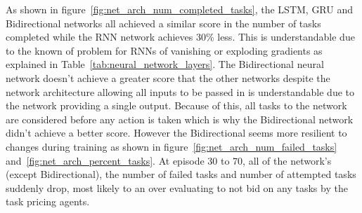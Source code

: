 As shown in figure~\ref{fig:net_arch_num_completed_tasks}, the LSTM, GRU and Bidirectional networks all achieved a
similar score in the number of tasks completed while the RNN network achieves 30\% less. This is understandable due to
the known of problem for RNNs of vanishing or exploding gradients as explained in Table~\ref{tab:neural_network_layers}.
The Bidirectional neural network doesn't achieve a greater score that the other networks despite the network
architecture allowing all inputs to be passed in is understandable due to the network providing a single output.
Because of this, all tasks to the network are considered before any action is taken which is why the Bidirectional
network didn't achieve a better score. However the Bidirectional seems more resilient to changes during training as
shown in figure~\ref{fig:net_arch_num_failed_tasks} and~\ref{fig:net_arch_percent_tasks}. At episode 30 to 70, all
of the network's (except Bidirectional), the number of failed tasks and number of attempted tasks suddenly drop, most
likely to an over evaluating to not bid on any tasks by the task pricing agents.
